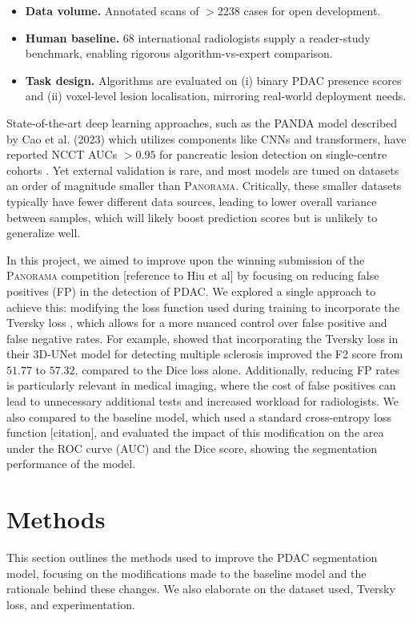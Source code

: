 \documentclass[conference]{IEEEtran}
\begin{document}
\begin{itemize}[leftmargin=*]
  \item \textbf{Data volume.} Annotated scans of $>$2238 cases for open development.
  \item \textbf{Human baseline.} 68 international radiologists supply a reader-study benchmark, enabling rigorous algorithm-vs-expert comparison.
  \item \textbf{Task design.} Algorithms are evaluated on (i) binary PDAC presence scores and (ii) voxel-level lesion localisation, mirroring real-world deployment needs.
\end{itemize}

State-of-the-art deep learning approaches, such as the PANDA model described by Cao et al. (2023) which utilizes components like CNNs and transformers, have reported NCCT AUCs $>0.95$ for pancreatic lesion detection on single-centre cohorts \cite{b9}. Yet external validation is rare, and most models are tuned on datasets an order of magnitude smaller than \textsc{Panorama}. Critically, these smaller datasets typically have fewer different data sources, leading to lower overall variance between samples, which will likely boost prediction scores but is unlikely to generalize well.

In this project, we aimed to improve upon the winning submission of the \textsc{Panorama} competition [reference to Hiu et al] by focusing on reducing false positives (FP) in the detection of PDAC. We explored a single approach to achieve this: modifying the loss function used during training to incorporate the Tversky loss \cite{b10}, which allows for a more nuanced control over false positive and false negative rates. For example,\cite{b10} showed that incorporating the Tversky loss in their 3D-UNet model for detecting multiple sclerosis improved the F2 score from $51.77$ to $57.32$, compared to the Dice loss alone. Additionally, reducing FP rates is particularly relevant in medical imaging, where the cost of false positives can lead to unnecessary additional tests and increased workload for radiologists. We also compared to the baseline model, which used a standard cross-entropy loss function [citation], and evaluated the impact of this modification on the area under the ROC curve (AUC) and the Dice score, showing the segmentation performance of the model.

\section{Methods}
This section outlines the methods used to improve the PDAC segmentation model, focusing on the modifications made to the baseline model and the rationale behind these changes. We also elaborate on the dataset used, Tversky loss, and experimentation. 
\end{document}
